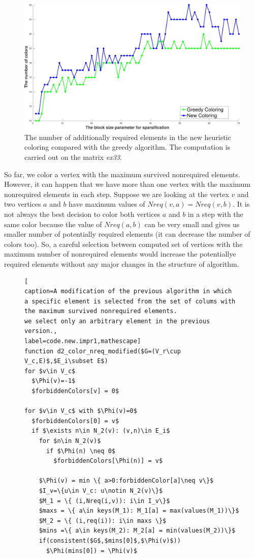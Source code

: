\documentclass[11pt, twoside,a4paper]{book}
\begin{document}
\begin{figure}
\centering
\includegraphics[width=0.9\linewidth]{bls_cols_ex33_without_alpha}
\caption{The number of additionally required elements in the new heuristic coloring compared with the greedy algorithm.
The computation is carried out on the matrix \textit{ex33}. }
\label{bls_cols_ex33_without_alpha}
\end{figure}
So far, we color a vertex with the maximum survived nonrequired elements.
However, it can happen
that we have more than one vertex with the maximum nonrequired elements in each step.
Suppose we are looking at the vertex $v$ and two vertices $a$ and $b$ have maximum values of
$Nreq(v,a) = Nreq(v,b)$.
It is not always the best decision
to color both vertices $a$ and $b$ in a step with the same color
because the value of $Nreq(a,b)$ can be very small and gives us smaller number
of potentially required elements (it can decrease the number of colors too).
So, a careful selection between computed set of vertices with the maximum number of
nonrequired elements would increase the potentiallye required elements without
any major changes in the structure of algorithm.
\begin{figure}
\begin{lstlisting}[
caption=A modification of the previous algorithm in which
a specific element is selected from the set of colums with
the maximum survived nonrequired elements.
we select only an arbitrary element in the previous version.,
label=code.new.impr1,mathescape]
function d2_color_nreq_modified($G=(V_r\cup V_c,E)$,$E_i\subset E$)
for $v\in V_c$
  $\Phi(v)=-1$
  $forbiddenColors[v] = 0$

for $v\in V_c$ with $\Phi(v)=0$
  $forbiddenColors[0] = v$
  if $\exists n\in N_2(v): (v,n)\in E_i$
    for $n\in N_2(v)$
      if $\Phi(n) \neq 0$
        $forbiddenColors[\Phi(n)] = v$

    $\Phi(v) = min \{ a>0:forbiddenColor[a]\neq v\}$
    $I_v=\{u\in V_c: u\notin N_2(v)\}$
    $M_1 = \{ (i,Nreq(i,v)): i\in I_v\}$
    $maxs = \{ a\in keys(M_1): M_1[a] = max(values(M_1))\}$
    $M_2 = \{ (i,req(i)): i\in maxs \}$
    $mins =\{ a\in keys(M_2): M_2[a] = min(values(M_2))\}$
    if(consistent($G$,$mins[0]$,$\Phi(v)$))
      $\Phi(mins[0]) = \Phi(v)$
\end{lstlisting}
\end{figure}
\end{document}
